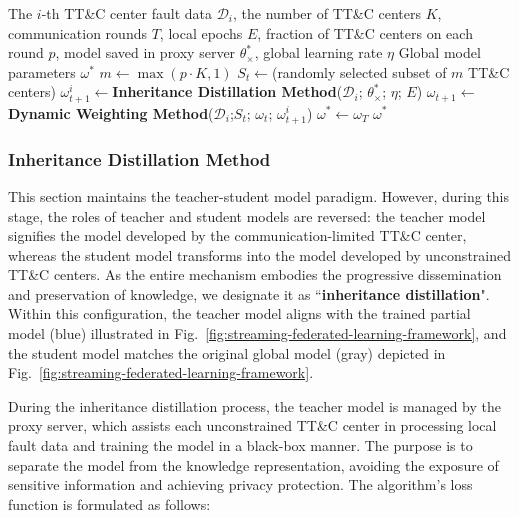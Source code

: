 \begin{algorithm}[t]
	\caption{FL-PFC Algorithm}
	\label{Alg:FL-PFC}
	\begin{algorithmic}[1]
		\REQUIRE The $i$-th TT\&C center fault data ${{\mathscr D}_{i}}$, the number of TT\&C centers $K$, communication rounds $T$, local epochs $E$, fraction of TT\&C centers on each round $p$, model saved in proxy server $\theta _ \times ^ * $, global learning rate $\eta $
		\ENSURE Global model parameters ${\omega ^ * }$
		\STATE $m \leftarrow \max \left( {p \cdot K,1} \right)$
		\STATE ${S_t} \leftarrow $(randomly selected subset of $m$ TT\&C centers)
		\STATE $\omega _{t+1}^i \leftarrow $\textbf{Inheritance Distillation Method}(${{\mathscr D}_{i}}$; $\theta _ \times ^ * $; ${\eta}$; $E$)
		\ENDFOR
		\STATE ${\omega _{t + 1}} \leftarrow $\textbf{Dynamic Weighting Method}(${{\mathscr D}_{i}}$;${S_t}$; $\omega _{t}$; $\omega _{t+1}^i$)
		\ENDFOR
		\STATE ${\omega ^ * } \leftarrow {\omega _T}$
		\RETURN ${\omega ^ * }$
	\end{algorithmic}
\end{algorithm}

\subsubsection{Inheritance Distillation Method}
\label{section:3-2-1}
This section maintains the teacher-student model paradigm. 
However, during this stage, the roles of teacher and student models are reversed: 
the teacher model signifies the model developed by the communication-limited TT\&C center,
whereas the student model transforms into the model developed by unconstrained TT\&C centers. 
As the entire mechanism embodies the progressive dissemination and preservation of knowledge, 
we designate it as ``\textbf{inheritance distillation}". 
Within this configuration, the teacher model aligns with the trained partial model (blue) illustrated in Fig.~\ref{fig:streaming-federated-learning-framework}, 
and the student model matches the original global model (gray) depicted in Fig.~\ref{fig:streaming-federated-learning-framework}.

During the inheritance distillation process, the teacher model is managed by the proxy server, 
which assists each unconstrained TT\&C center in processing local fault data and training the model in a black-box manner. 
The purpose is to separate the model from the knowledge representation, avoiding the exposure of sensitive information and achieving privacy protection. 
The algorithm's loss function is formulated as follows:

